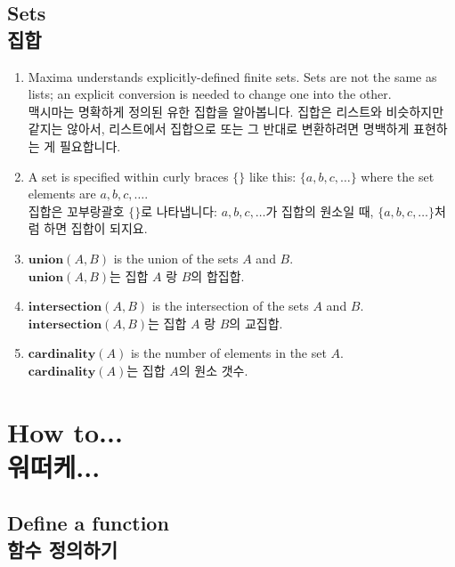 \documentclass[12pt]{article}
\begin{document}
\subsection{Sets \\ 집합}

\begin{enumerate}

\item Maxima understands explicitly-defined finite sets.
    Sets are not the same as lists; an explicit conversion is needed to change one into the other. \\
    맥시마는 명확하게 정의된 유한 집합을 알아봅니다.
    집합은 리스트와 비슷하지만 같지는 않아서, 리스트에서 집합으로 또는 그 반대로 변환하려면 명백하게 표현하는 게 필요합니다.
    
\item A set is specified within curly braces $\{ \}$ like this:
    $\{a, b, c, \ldots\}$ where the set elements are $a, b, c, \ldots$. \\
    집합은 꼬부랑괄호 $\{ \}$로 나타냅니다: $a, b, c, \ldots$가 집합의 원소일 때, $\{a, b, c, \ldots\}$처럼 하면 집합이 되지요.

\item $\mathbf{union} (A, B)$ is the union of the sets $A$ and $B$. \\
         $\mathbf{union} (A, B)$는 집합 $A$ 랑 $B$의 합집합.

\item $\mathbf{intersection} (A, B)$ is the intersection of the sets $A$ and $B$. \\
        $\mathbf{intersection} (A, B)$는 집합 $A$ 랑 $B$의 교집합.

\item $\mathbf{cardinality} (A)$ is the number of elements in the set $A$. \\
        $\mathbf{cardinality} (A)$는 집합 $A$의 원소 갯수.

\end{enumerate}

\section{How to...\\ 워떠케...}

\subsection{Define a function \\ 함수 정의하기}
\end{document}
